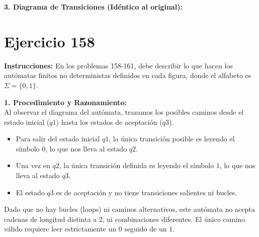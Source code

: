 \documentclass[12pt]{article}
\begin{document}
\vspace{0.5cm}

\textbf{3. Diagrama de Transiciones (Idéntico al original):}

\begin{center}
\end{center}

\section*{Ejercicio 158}

\textbf{Instrucciones:} En los problemas 158-161, debe describir lo que hacen los autómatas finitos no deterministas definidos en cada figura, donde el alfabeto es $\Sigma=\{0,1\}$.

\vspace{0.5cm}

\textbf{1. Procedimiento y Razonamiento:} \\
Al observar el diagrama del autómata, trazamos los posibles caminos desde el estado inicial ($q1$) hasta los estados de aceptación ($q3$). 
\begin{itemize}
    \item Para salir del estado inicial $q1$, la única transición posible es leyendo el símbolo $0$, lo que nos lleva al estado $q2$.
    \item Una vez en $q2$, la única transición definida es leyendo el símbolo $1$, lo que nos lleva al estado $q3$.
    \item El estado $q3$ es de aceptación y no tiene transiciones salientes ni bucles.
\end{itemize}
Dado que no hay bucles (loops) ni caminos alternativos, este autómata no acepta cadenas de longitud distinta a 2, ni combinaciones diferentes. El único camino válido requiere leer estrictamente un $0$ seguido de un $1$.
\end{document}
